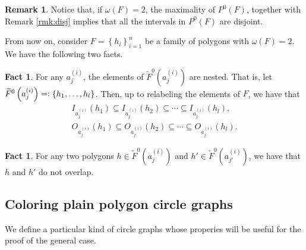 \documentclass[12pt]{article}
\theoremstyle{definition}
\newtheorem{rmk}[thm]{Remark}
\newtheorem{fact}[thm]{Fact}
\newcommand{\eqdef}{=\vcentcolon}
\begin{document}
     \begin{rmk}
         Notice that, if 
         $\omega\left(F\right) = 2$,
         the maximality of
         $P^{0}\left(F\right)$,
         together with 
         Remark \ref{rmk:disj}
         implies that all the
         intervals in $P^{0}\left(F\right)$
         are disjoint.
     \end{rmk}

     From now on, consider
     $F = \left\{h_{i}\right\}_{i = 1}^{n}$ 
     be a family of polygons
     with $\omega\left(F\right)=2$.
     We have the following two facts.

     \begin{fact} \label{fact:single}
         For any $a_{j}^{\left(i\right)}$,
         the elements of
         $\widetilde{F}^{0}\left(a_{j}^{\left(i\right)}\right)$ 
         are nested. That is, let
             $\widetilde{F}^{0}\left(a_{j}^{\left(i\right)}\right) 
             \eqdef \left\{h_1, \ldots, h_{l}\right\}$.
         Then, up to relabeling
         the elements of $F$, we have that
         \begin{gather*}
             I_{a_{j}^{\left(i\right)}}\left(h_1\right)
             \subseteq I_{a_{j}^{\left(i\right)}}\left(h_2\right)
             \subseteq \cdots
             \subseteq I_{a_{j}^{\left(i\right)}}\left(h_{l}\right), \\
             O_{a_{j}^{\left(i\right)}}\left(h_1\right)
             \subseteq O_{a_{j}^{\left(i\right)}}\left(h_2\right)
             \subseteq \cdots
             \subseteq O_{a_{j}^{\left(i\right)}}\left(h_{l}\right).
         \end{gather*}
     \end{fact}
     
     \begin{fact} \label{fact:double}
         For any two polygons
         $h \in \widetilde{F}^{0}\left(a_{j}^{\left(i\right)}\right)$ 
         and 
         $h' \in \widetilde{F}^{0}\left(a_{j'}^{\left(i\right)}\right)$, 
         we have that $h$ and $h'$
         do not overlap.    
     \end{fact}

     \subsection{Coloring plain polygon circle graphs}

     We define a particular
     kind of circle graphs
     whose properies
     will be useful for the
     proof of the general case.
\end{document}
